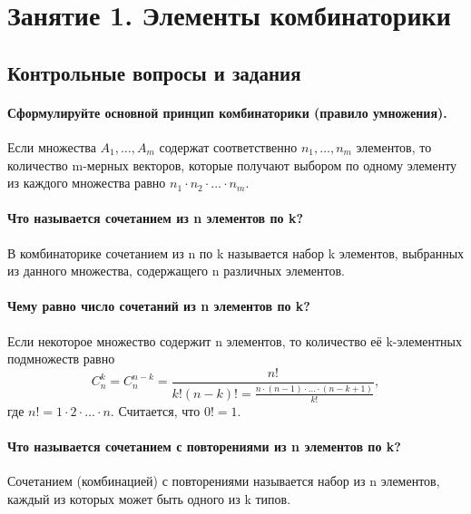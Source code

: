 \chapter*{Занятие 1. Элементы комбинаторики}

\section*{Контрольные вопросы и задания}

\subsubsection*{Сформулируйте основной принцип комбинаторики (правило умножения).}

Если множества
$A_1,  \dotsc , A_m$
содержат соответственно $n_1,  \dotsc , n_m$
элементов, то количество m-мерных векторов, которые получают выбором по одному элементу из каждого множества равно
$n_1\cdot n_2\cdot \dotsc \cdot n_m$.

\subsubsection*{Что называется сочетанием из n элементов по k?}

В комбинаторике сочетанием из n по k называется набор k элементов, выбранных из данного множества, содержащего n различных элементов.

\subsubsection*{Чему равно число сочетаний из n элементов по k?}

Если некоторое множество содержит n элементов, то количество её k-элементных подмножеств равно
$$ C_n^k = C_n^{n-k} = \frac{n!}{k!\left(n-k\right)! = \frac{n\cdot\left(n-1\right) \cdot \dotsc \cdot \left( n-k+1 \right) }{k!}} , $$
где $n!=1\cdot 2\cdot \dotsc \cdot n$.
Считается, что $0!=1$.

\subsubsection*{Что называется сочетанием с повторениями из n элементов по k?}

Сочетанием (комбинацией) с повторениями называется набор из n элементов, каждый из которых может быть одного из k типов.


